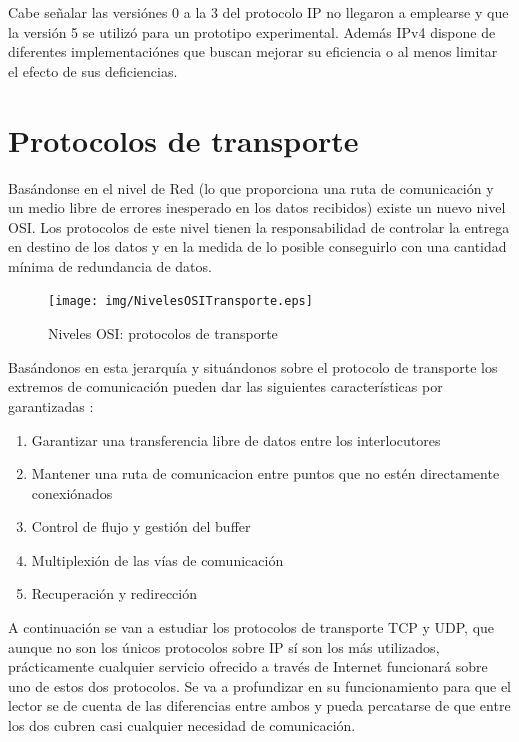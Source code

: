\documentclass[a4paper,spanish,12pt]{book}
\begin{document}
Cabe señalar las versiónes 0 a la 3 del protocolo IP no llegaron a emplearse  y que la versión 5 se utilizó para un prototipo experimental. Además IPv4 dispone de diferentes implementaciónes que buscan mejorar su eficiencia o al menos limitar el efecto de sus deficiencias.

\section{Protocolos de transporte}

Basándonse en el nivel de Red (lo que proporciona una ruta de comunicación y un medio libre de errores inesperado en los datos recibidos) existe un nuevo nivel OSI. Los protocolos de este nivel tienen la responsabilidad de controlar la entrega en destino de los datos y en la medida de lo posible conseguirlo con una cantidad mínima de redundancia de datos.

\begin{figure}
	\texttt{[image: img/NivelesOSITransporte.eps]}	
              \caption{Niveles OSI: protocolos de transporte}
  \label{fig:nivelesOSITransporte}
\end{figure}

Basándonos en esta jerarquía y situándonos sobre el protocolo de transporte los extremos de comunicación pueden dar las siguientes características por garantizadas :

\begin{enumerate}
	\item{Garantizar una transferencia libre de datos entre los interlocutores}
	\item{Mantener una ruta de comunicacion entre puntos que no est\'en directamente conexiónados}
	\item{Control de flujo y gestión del buffer}
	\item{Multiplexión de las vías de comunicación}
	\item{Recuperación y redirección}
\end{enumerate}

A continuación se van a estudiar los protocolos de transporte TCP y UDP, que aunque no son los únicos protocolos sobre IP sí son los más utilizados, prácticamente cualquier servicio ofrecido a través de Internet funcionará sobre uno de estos dos protocolos. Se va a profundizar en su funcionamiento para que el lector se de cuenta de las diferencias entre ambos y pueda percatarse de que entre los dos cubren casi cualquier necesidad de comunicación.
\end{document}
